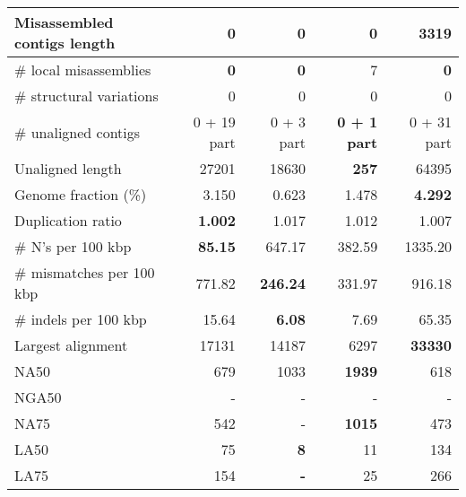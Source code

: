 \documentclass[12pt,a4paper]{article}
\begin{document}
\begin{table}[ht]
\begin{center}
\begin{tabular}{|l*{4}{|r}|}
Misassembled contigs length & {\bf 0} & {\bf 0} & {\bf 0} & 3319 \\ \hline
\# local misassemblies & {\bf 0} & {\bf 0} & 7 & {\bf 0} \\ \hline
\# structural variations & 0 & 0 & 0 & 0 \\ \hline
\# unaligned contigs & 0 + 19 part & 0 + 3 part & {\bf 0 + 1 part} & 0 + 31 part \\ \hline
Unaligned length & 27201 & 18630 & {\bf 257} & 64395 \\ \hline
Genome fraction (\%) & 3.150 & 0.623 & 1.478 & {\bf 4.292} \\ \hline
Duplication ratio & {\bf 1.002} & 1.017 & 1.012 & 1.007 \\ \hline
\# N's per 100 kbp & {\bf 85.15} & 647.17 & 382.59 & 1335.20 \\ \hline
\# mismatches per 100 kbp & 771.82 & {\bf 246.24} & 331.97 & 916.18 \\ \hline
\# indels per 100 kbp & 15.64 & {\bf 6.08} & 7.69 & 65.35 \\ \hline
Largest alignment & 17131 & 14187 & 6297 & {\bf 33330} \\ \hline
NA50 & 679 & 1033 & {\bf 1939} & 618 \\ \hline
NGA50 & - & - & - & - \\ \hline
NA75 & 542 & - & {\bf 1015} & 473 \\ \hline
LA50 & 75 & {\bf 8} & 11 & 134 \\ \hline
LA75 & 154 & {\bf -} & 25 & 266 \\ \hline
\end{tabular}
\end{center}
\end{table}
\end{document}
